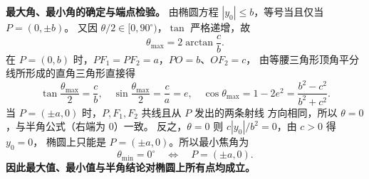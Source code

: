 \begin{proofbox}
\medskip
\textbf{最大角、最小角的确定与端点检验。}
由椭圆方程 $|y_0|\leq b$，等号当且仅当 $P=(0,\pm b)$。
又因 $\theta/2\in[0,90^\circ)$，$\tan$ 严格递增，故
\[
 \boxed{\theta_{\max}=2\arctan\frac cb}.
\]
在 $P=(0,b)$ 时，$PF_1=PF_2=a$，$PO=b$、$OF_2=c$，
由等腰三角形顶角平分线所形成的直角三角形直接得
\[
 \tan\frac{\theta_{\max}}2=\frac cb,\quad
 \sin\frac{\theta_{\max}}2=\frac ca=e,\quad
 \cos\theta_{\max}=1-2e^2=\frac{b^2-c^2}{b^2+c^2}.
\]
当 $P=(\pm a,0)$ 时，$P,F_1,F_2$ 共线且从 $P$ 发出的两条射线
方向相同，所以 $\theta=0$，与半角公式（右端为 $0$）一致。
反之，$\theta=0$ 则 $c|y_0|/b^2=0$，由 $c>0$ 得 $y_0=0$，
椭圆上只能是 $P=(\pm a,0)$。所以最小焦角为
\[
  \boxed{\theta_{\min}=0^\circ\quad\Longleftrightarrow\quad
  P=(\pm a,0)}.
\]
\textbf{因此最大值、最小值与半角结论对椭圆上所有点均成立。}
\end{proofbox}
